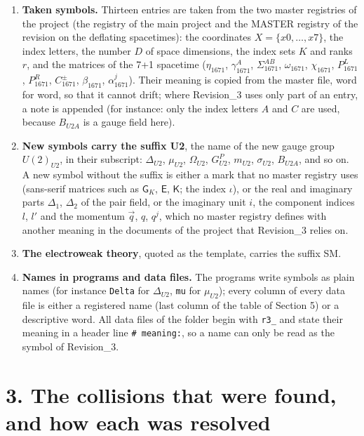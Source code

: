 \documentclass[
  10pt,
]{article}
\providecommand{\tightlist}{%
  \setlength{\itemsep}{0pt}\setlength{\parskip}{0pt}}
\begin{document}
\begin{enumerate}
\def\labelenumi{\arabic{enumi}.}
\tightlist
\item
  \textbf{Taken symbols.} Thirteen entries are taken from the two master
  registries of the project (the registry of the main project and the
  MASTER registry of the revision on the deflating spacetimes): the
  coordinates \(X=\{x0,\dots,x7\}\), the index letters, the number \(D\)
  of space dimensions, the index sets \(K\) and ranks \(r\), and the
  matrices of the 7+1 spacetime (\(\eta_{1671}\), \(\gamma^A_{1671}\),
  \(\Sigma^{AB}_{1671}\), \(\omega_{1671}\), \(\chi_{1671}\),
  \(P^L_{1671}\), \(P^R_{1671}\), \(C^\pm_{1671}\), \(\beta_{1671}\),
  \(\alpha^j_{1671}\)). Their meaning is copied from the master file,
  word for word, so that it cannot drift; where Revision\_3 uses only
  part of an entry, a note is appended (for instance: only the index
  letters \(A\) and \(C\) are used, because \(B_{U2A}\) is a gauge field
  here).
\item
  \textbf{New symbols carry the suffix U2}, the name of the new gauge
  group \(U(2)_{U2}\), in their subscript: \(\Delta_{U2}\),
  \(\mu_{U2}\), \(\Omega_{U2}\), \(G^P_{U2}\), \(m_{U2}\),
  \(\sigma_{U2}\), \(B_{U2A}\), and so on. A new symbol without the
  suffix is either a mark that no master registry uses (sans-serif
  matrices such as \(\mathsf G_K\), \(\mathsf E\), \(\mathsf K\); the
  index \(\iota\)), or the real and imaginary parts \(\Delta_1\),
  \(\Delta_2\) of the pair field, or the imaginary unit \(i\), the
  component indices \(l\), \(l'\) and the momentum \(\vec q\), \(q\),
  \(q^j\), which no master registry defines with another meaning in the
  documents of the project that Revision\_3 relies on.
\item
  \textbf{The electroweak theory}, quoted as the template, carries the
  suffix SM.
\item
  \textbf{Names in programs and data files.} The programs write symbols
  as plain names (for instance \texttt{Delta} for \(\Delta_{U2}\),
  \texttt{mu} for \(\mu_{U2}\)); every column of every data file is
  either a registered name (last column of the table of Section 5) or a
  descriptive word. All data files of the folder begin with
  \texttt{r3\_} and state their meaning in a header line
  \texttt{\#\ meaning:}, so a name can only be read as the symbol of
  Revision\_3.
\end{enumerate}

\hypertarget{the-collisions-that-were-found-and-how-each-was-resolved}{%
\section{3. The collisions that were found, and how each was
resolved}\label{the-collisions-that-were-found-and-how-each-was-resolved}}
\end{document}
